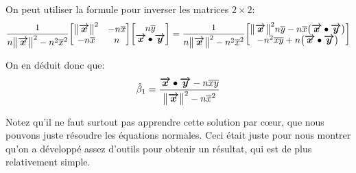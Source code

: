 \documentclass[a4paper]{article}
\begin{document}
{    On peut utiliser la formule pour inverser les matrices $2 \times 2$:
    \[\frac{1}{n \left\|\bvec{x}\right\|^2 - n^2 \bar{x}^2} \begin{bmatrix} \left\|\bvec{x}\right\|^2 & -n \bar{x} \\ -n \bar{x} & n \end{bmatrix} \begin{bmatrix} n \bar{y} \\ \bvec{x} \dotprod \bvec{y} \end{bmatrix} = \frac{1}{n \left\|\bvec{x}\right\|^2 - n^2 \bar{x}^2} \begin{bmatrix} \left\|\bvec{x}\right\|^2 n \bar{y} - n \bar{x} \left(\bvec{x} \dotprod \bvec{y}\right) \\ -n^2 \bar{x} \bar{y} + n\left(\bvec{x} \dotprod \bvec{y}\right)  \end{bmatrix}\]

    On en déduit donc que:
    \[\hat{\beta}_1 = \frac{\bvec{x} \dotprod \bvec{y} - n \bar{x} \bar{y}}{\left\|\bvec{x}\right\|^2 - n \bar{x}^2}\]

    Notez qu'il ne faut surtout pas apprendre cette solution par cœur, que nous pouvons juste résoudre les équations normales. Ceci était juste pour nous montrer qu'on a développé assez d'outils pour obtenir un résultat, qui est de plus relativement simple.
}

\end{document}

